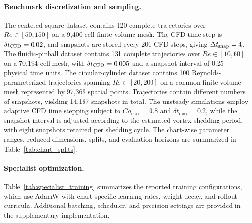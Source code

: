 \documentclass{article}
\begin{document}
\paragraph{Benchmark discretization and sampling.}
The centered-square dataset contains 120 complete trajectories over
$Re\in[50,150]$ on a 9,400-cell finite-volume mesh. The CFD time step is $\delta t_{\rm CFD}=0.02$, and snapshots are stored every 200 CFD steps, giving $\Delta t_{\rm snap}=4$. The fluidic-pinball dataset contains 131 complete trajectories over $Re\in[10,60]$ on a 70,194-cell mesh, with $\delta t_{\rm CFD}=0.005$ and a snapshot interval of $0.25$ physical time units. The circular-cylinder dataset contains 100 Reynolds-parameterized trajectories spanning
$Re\in[20,200]$ on a common finite-volume mesh represented by 97,368 spatial points. Trajectories contain different numbers of snapshots, yielding 14,167 snapshots in total. The unsteady simulations employ adaptive CFD time stepping subject to $Co_{\max}=0.8$ and $\delta t_{\max}=0.2$, while the snapshot interval is adjusted according to the estimated vortex-shedding period, with eight snapshots retained per shedding cycle. The chart-wise parameter ranges, reduced dimensions, splits, and evaluation horizons are summarized in Table~\ref{tab:chart_splits}.


\paragraph{Specialist optimization.}
Table~\ref{tab:specialist_training} summarizes the reported training configurations, which use AdamW with chart-specific learning rates, weight decay, and rollout curricula.
Additional batching, scheduler, and precision settings are provided in the supplementary implementation.

\par
\end{document}
